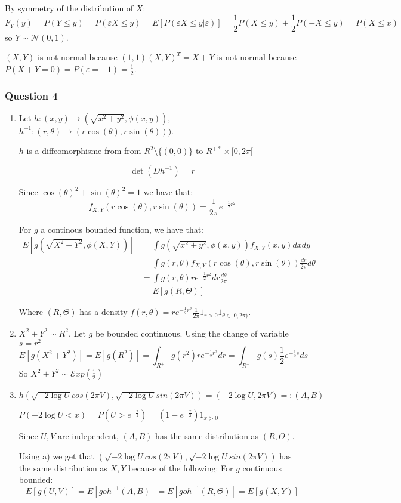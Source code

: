 \documentclass[12pt]{article}
\newcommand{\Q}[1]{\subsubsection*{Question #1}}
\begin{document}
By symmetry of the distribution of $X$:
$$F_Y(y) = P(Y \leq y) = P(\varepsilon X \leq y) = E[ P(\varepsilon X \leq y | \varepsilon) ] = \frac1 2 P(X \leq y) + \frac1 2 P(- X \leq y) = P(X \leq x)$$
so $Y \sim \mathcal N(0, 1)$.

$(X, Y)$ is not  normal because $(1, 1) (X, Y)^T = X+Y$ is not normal because $P(X+Y = 0) = P(\varepsilon = -1) = \frac1 2$.


\Q{4}
\begin{enumerate}[label=\alph*)]
\item 
Let $h: (x, y) \rightarrow (\sqrt{x^2 + y^2}, \phi(x, y))$,
$h^{-1}: (r, \theta) \rightarrow (r \cos(\theta),r \sin(\theta)))$.


$h$ is a diffeomorphisme from from $R^2 \setminus \{(0,0)\}$ to $R^{+*} \times [0, 2\pi[$

$$\det(Dh^{-1}) = r$$

Since $\cos(\theta)^2 + \sin(\theta)^2 =1 $ we have that:
$$f_{X,Y}(r\cos(\theta),r\sin(\theta)) = \frac{1}{2\pi} e^{-\frac 1 2 r^2}$$

For $g$ a continous bounded function, we have that:
\begin{align*}E[g(\sqrt{X^2 + Y^2}, \phi(X, Y))] 
&= \int g(\sqrt{x^2 + y^2}, \phi(x, y)) f_{X,Y}(x,y) dx dy
\\&= \int g(r, \theta) f_{X,Y}(r\cos(\theta),r\sin(\theta)) \frac{dr}{2\pi} d\theta
\\&= \int g(r, \theta) r e^{-\frac1 2 r^2} dr \frac{d\theta}{2\pi}
\\&= E[g(R, \Theta)]
\end{align*}

Where $(R, \Theta)$ has a density $f(r, \theta) = r e^{-\frac1 2 r^2}  \frac{1}{2\pi} 1_{r>0} 1_{\theta \in [0, 2\pi)}$.


\item $X^2 + Y^2 \sim R^2$.
Let $g$ be bounded continuous. Using the change of variable $s = r^2$
$$E[g(X^2 + Y^2)] = E[g(R^2)] = \int_{R^+} g(r^2) r  e^{-\frac1 2 r^2}dr = \int_{R^+} g(s) \frac{1}{2} e^{-\frac 1 2 s} ds$$
So $X^2 + Y^2 \sim \mathcal Exp(\frac 1 2)$


\item 

$h(\sqrt{-2\log U} cos(2\pi V), \sqrt{-2\log U} sin(2\pi V)) = (-2 \log U, 2\pi V) =: (A, B)$

$P(-2 \log U < x) = P(U > e^{-\frac {x} 2}) = (1 - e^{-\frac {x} 2}) 1_{x>0}$

Since $U, V$ are independent, $(A, B)$ has the same distribution as $(R, \Theta)$. 


Using a) we get that $(\sqrt{-2\log U} cos(2\pi V), \sqrt{-2\log U} sin(2\pi V))$ has the same distribution as $X, Y$ because of the following:
For $g$ continuous bounded:
$$E[g(U, V)] = E[goh^{-1}(A, B)] = E[ goh^{-1}(R, \Theta) ] = E[ g(X, Y)]$$


\end{enumerate}
\end{document}
